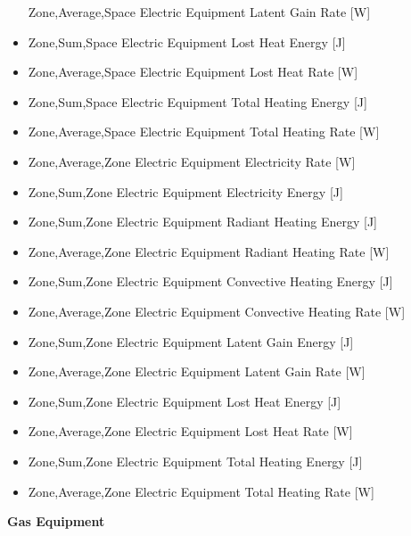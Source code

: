 \begin{itemize}
  Zone,Average,Space Electric Equipment Latent Gain Rate {[}W{]}
\item
  Zone,Sum,Space Electric Equipment Lost Heat Energy {[}J{]}
\item
  Zone,Average,Space Electric Equipment Lost Heat Rate {[}W{]}
\item
  Zone,Sum,Space Electric Equipment Total Heating Energy {[}J{]}
\item
  Zone,Average,Space Electric Equipment Total Heating Rate {[}W{]}
\item
  Zone,Average,Zone Electric Equipment Electricity Rate {[}W{]}
\item
  Zone,Sum,Zone Electric Equipment Electricity Energy {[}J{]}
\item
  Zone,Sum,Zone Electric Equipment Radiant Heating Energy {[}J{]}
\item
  Zone,Average,Zone Electric Equipment Radiant Heating Rate {[}W{]}
\item
  Zone,Sum,Zone Electric Equipment Convective Heating Energy {[}J{]}
\item
  Zone,Average,Zone Electric Equipment Convective Heating Rate {[}W{]}
\item
  Zone,Sum,Zone Electric Equipment Latent Gain Energy {[}J{]}
\item
  Zone,Average,Zone Electric Equipment Latent Gain Rate {[}W{]}
\item
  Zone,Sum,Zone Electric Equipment Lost Heat Energy {[}J{]}
\item
  Zone,Average,Zone Electric Equipment Lost Heat Rate {[}W{]}
\item
  Zone,Sum,Zone Electric Equipment Total Heating Energy {[}J{]}
\item
  Zone,Average,Zone Electric Equipment Total Heating Rate {[}W{]}
\end{itemize}

\textbf{Gas Equipment}

